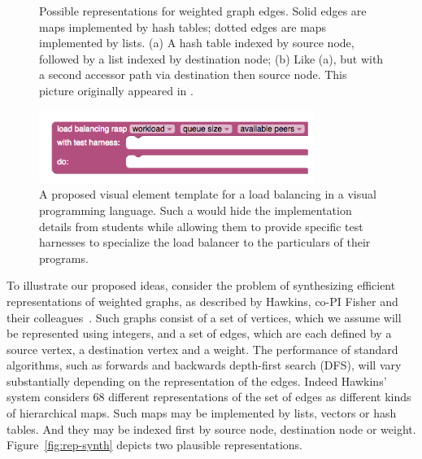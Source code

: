 \begin{figure}[h]
\begin{minipage}{.45\textwidth}
\begin{tikzpicture}[style=g,node distance=0.8cm]
    \end{tikzpicture}
    \caption{Possible representations for weighted graph edges.  Solid edges
      are maps implemented by hash tables; dotted edges are maps implemented
      by lists.  (a) A hash table
      indexed by source node, followed by a list indexed by destination node;
      (b) Like (a), but with a second accessor path via destination then
      source node.
      This picture originally appeared in \cite{data-rep-synth}.}
    \label{fig:rep-synth}
  \end{minipage}%
  \hfill{}
  \begin{minipage}{.45\textwidth}
    \centering
    \includegraphics[width=0.8\textwidth]{rasp}
    \caption{\label{fig:rasp}A proposed visual element template for a load
      balancing \rasp in a visual programming language.  Such a \rasp
      would hide the implementation details from students while allowing them
      to provide specific test harnesses to specialize the load balancer
      to the particulars of their programs.}
  \end{minipage}
  \hfill{}
  
\end{figure}

To illustrate our proposed ideas, consider the problem of synthesizing
efficient representations of weighted graphs, as described by Hawkins,
co-PI Fisher and their colleagues~\cite{data-rep-synth}.  Such graphs
consist of a set of vertices, which we assume will be represented
using integers, and a set of edges, which are each defined by a source
vertex, a destination vertex and a weight.  The performance of
standard algorithms, such as forwards and backwards depth-first search
(DFS), will vary substantially depending on the representation of the
edges.  Indeed Hawkins' system considers 68 different representations
of the set of edges as different kinds of hierarchical maps.  Such
maps may be implemented by lists, vectors or hash tables.  And they
may be indexed first by source node, destination node or weight.
Figure~\ref{fig:rep-synth} depicts two plausible
representations.

